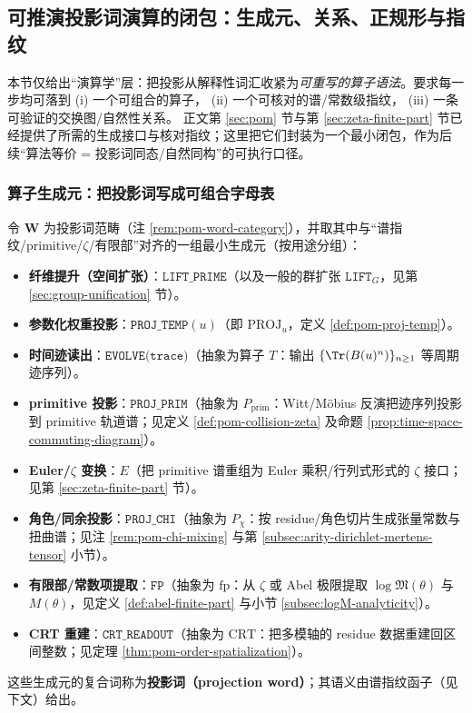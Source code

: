 \subsection{可推演投影词演算的闭包：生成元、关系、正规形与指纹}\label{subsec:pom-derivable-calculus-closure}
本节仅给出“演算学”层：把投影从解释性词汇收紧为\emph{可重写的算子语法}。要求每一步均可落到
(i) 一个可组合的算子，
(ii) 一个可核对的谱/常数级指纹，
(iii) 一条可验证的交换图/自然性关系。
正文第 \ref{sec:pom} 节与第 \ref{sec:zeta-finite-part} 节已经提供了所需的生成接口与核对指纹；这里把它们封装为一个最小闭包，作为后续“算法等价 = 投影词同态/自然同构”的可执行口径。

\subsubsection{算子生成元：把投影词写成可组合字母表}
\begin{definition}[投影词演算的最小算子闭包]\label{def:pom-operator-generators-min}
令 \(\mathbf{W}\) 为投影词范畴（注 \ref{rem:pom-word-category}），并取其中与“谱指纹/primitive/\(\zeta\)/有限部”对齐的一组最小生成元（按用途分组）：
\begin{itemize}
  \item \textbf{纤维提升（空间扩张）}：\(\texttt{LIFT\_PRIME}\)（以及一般的群扩张 \(\texttt{LIFT}_G\)，见第 \ref{sec:group-unification} 节）。
  \item \textbf{参数化权重投影}：\(\texttt{PROJ\_TEMP}(u)\)（即 \(\mathrm{PROJ}_u\)，定义 \ref{def:pom-proj-temp}）。
  \item \textbf{时间迹读出}：\(\texttt{EVOLVE(trace)}\)（抽象为算子 \(T\)：输出 \(\{\Tr(B(u)^n)\}_{n\ge 1}\) 等周期迹序列）。
  \item \textbf{primitive 投影}：\(\texttt{PROJ\_PRIM}\)（抽象为 \(P_{\mathrm{prim}}\)：Witt/Möbius 反演把迹序列投影到 primitive 轨道谱；见定义 \ref{def:pom-collision-zeta} 及命题 \ref{prop:time-space-commuting-diagram}）。
  \item \textbf{Euler/\(\zeta\) 变换}：\(E\)（把 primitive 谱重组为 Euler 乘积/行列式形式的 \(\zeta\) 接口；见第 \ref{sec:zeta-finite-part} 节）。
  \item \textbf{角色/同余投影}：\(\texttt{PROJ\_CHI}\)（抽象为 \(P_\chi\)：按 residue/角色切片生成张量常数与扭曲谱；见注 \ref{rem:pom-chi-mixing} 与第 \ref{subsec:arity-dirichlet-mertens-tensor} 小节）。
  \item \textbf{有限部/常数项提取}：\(\texttt{FP}\)（抽象为 \(\mathrm{fp}\)：从 \(\zeta\) 或 Abel 极限提取 \(\log\mathfrak{M}(\theta)\) 与 \(M(\theta)\)，见定义 \ref{def:abel-finite-part} 与小节 \ref{subsec:logM-analyticity}）。
  \item \textbf{CRT 重建}：\(\texttt{CRT\_READOUT}\)（抽象为 \(\mathrm{CRT}\)：把多模轴的 residue 数据重建回区间整数；见定理 \ref{thm:pom-order-spatialization}）。
\end{itemize}
这些生成元的复合词称为\textbf{投影词（projection word）}；其语义由谱指纹函子（见下文）给出。
\end{definition}

